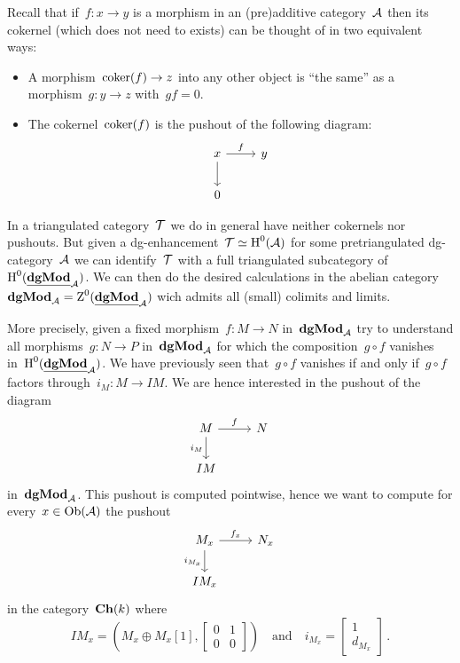 \documentclass[a4paper,10pt]{scrartcl}
\begin{document}
Recall that if~$f \colon x \to y$ is a morphism in an (pre)additive category~$\mathcal{A}$ then its cokernel (which does not need to exists) can be thought of in two equivalent ways:
\begin{itemize}
  \item
    A morphism~$\operatorname{coker}(f) \to z$ into any other object is \enquote{the same} as a morphism~$g \colon y \to z$ with~$g f = 0$.
  \item
    The cokernel~$\operatorname{coker}(f)$ is the pushout of the following diagram:
    \[
      \begin{tikzcd}
        x
        \arrow{r}[above]{f}
        \arrow{d}
        &
        y
        \\
        0
        &
        {}
      \end{tikzcd}
    \]
\end{itemize}

In a triangulated category~$\mathcal{T}$ we do in general have neither cokernels nor pushouts.
But given a dg-enhancement~$\mathcal{T} \simeq \operatorname{H}^0(\mathcal{A})$ for some pretriangulated dg-category~$\mathcal{A}$ we can identify~$\mathcal{T}$ with a full triangulated subcategory of~$\operatorname{H}^0(\underline{\mathbf{dgMod}}_{\mathcal{A}})$.
We can then do the desired calculations in the abelian category~$\mathbf{dgMod}_{\mathcal{A}} = \operatorname{Z}^0(\underline{\mathbf{dgMod}}_{\mathcal{A}})$ wich admits all (small) colimits and limits.

More precisely, given a fixed morphism~$f \colon M \to N$ in~$\mathbf{dgMod}_{\mathcal{A}}$ try to understand all morphisms~$g \colon N \to P$ in~$\mathbf{dgMod}_{\mathcal{A}}$ for which the composition~$g \circ f$ vanishes in~$\operatorname{H}^0(\underline{\mathbf{dgMod}}_{\mathcal{A}})$.
We have previously seen that~$g \circ f$ vanishes if and only if~$g \circ f$ factors through~$i_M \colon M \to IM$.
We are hence interested in the pushout of the diagram
\[
  \begin{tikzcd}
    M
    \arrow{r}[above]{f}
    \arrow{d}[left]{i_M}
    &
    N
    \\
    IM
    &
    {}
  \end{tikzcd}
\]
in~$\mathbf{dgMod}_{\mathcal{A}}$.
This pushout is computed pointwise, hence we want to compute for every~$x \in \operatorname{Ob}(\mathcal{A})$ the pushout
\[
  \begin{tikzcd}
    M_x
    \arrow{r}[above]{f_x}
    \arrow{d}[left]{i_{M_x}}
    &
    N_x
    \\
    I M_x
    &
    {}
  \end{tikzcd}
\]
in the category~$\mathbf{Ch}(k)$ where
\[
  I M_x
  =
  \left(
    M_x \oplus M_x[1],
    \begin{bmatrix}
      0 & 1 \\
      0 & 0
    \end{bmatrix}
  \right)
  \quad\text{and}\quad
  i_{M_x}
  =
  \begin{bmatrix}
    1 \\
    d_{M_x}
  \end{bmatrix} \,.
\]
\end{document}
